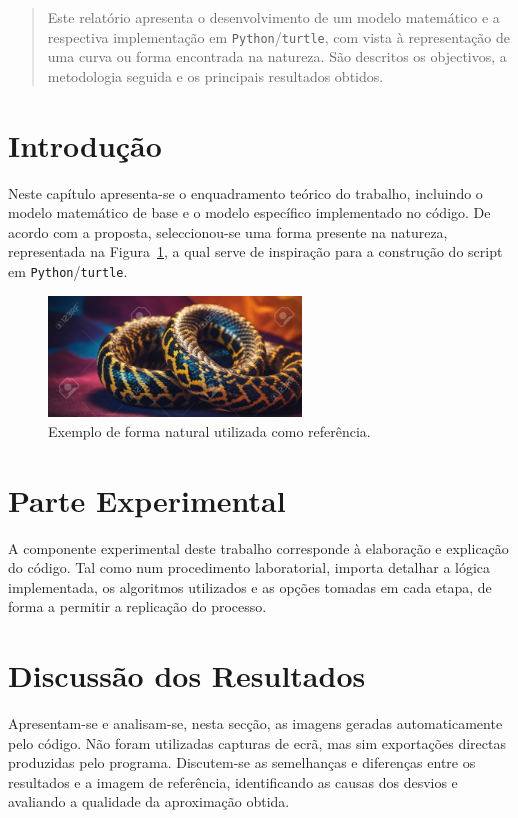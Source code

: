 \documentclass[12pt,a4paper,oneside]{extarticle}
\begin{document}

\begin{abstract}
Este relatório apresenta o desenvolvimento de um modelo matemático e a respectiva implementação em \texttt{Python}/\texttt{turtle}, com vista à representação de uma curva ou forma encontrada na natureza. São descritos os objectivos, a metodologia seguida e os principais resultados obtidos. 
\end{abstract}

\section{Introdução}
Neste capítulo apresenta-se o enquadramento teórico do trabalho, incluindo o modelo matemático de base e o modelo específico implementado no código.  
De acordo com a proposta, seleccionou-se uma forma presente na natureza, representada na Figura~\ref{fig:referencia}, a qual serve de inspiração para a construção do script em \texttt{Python}/\texttt{turtle}.

\begin{figure}[ht!]
    \centering
    \includegraphics[width=0.6\textwidth]{figuras/220853406-snake.png}
    \caption{Exemplo de forma natural utilizada como referência.}
    \label{fig:referencia}
\end{figure}

\section{Parte Experimental}
A componente experimental deste trabalho corresponde à elaboração e explicação do código\cite{carvalho2021praticas}.  
Tal como num procedimento laboratorial, importa detalhar a lógica implementada\cite{martins2015programacao}, os algoritmos utilizados e as opções tomadas em cada etapa, de forma a permitir a replicação do processo.  



\section{Discussão dos Resultados}
Apresentam-se e analisam-se, nesta secção, as imagens geradas automaticamente pelo código.  
Não foram utilizadas capturas de ecrã, mas sim exportações directas produzidas pelo programa.  
Discutem-se as semelhanças e diferenças entre os resultados e a imagem de referência, identificando as causas dos desvios e avaliando a qualidade da aproximação obtida.  
\end{document}
